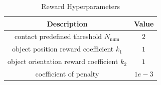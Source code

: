 \begin{table}[h]
    \centering
    \caption{Reward Hyperparameters}
    \begin{tabular}{c|c}
    \hline
    Description & Value \\
    \hline
        contact predefined threshold $N_{\text{num}}$ & $2$ \\
        object position reward coefficient $k_{1}$ & $1$ \\
        object orientation reward coefficient $k_{2}$ & $1$ \\
        coefficient of penalty & $1e-3$ \\

    \end{tabular}
    \label{table:reward_hype}
\end{table}